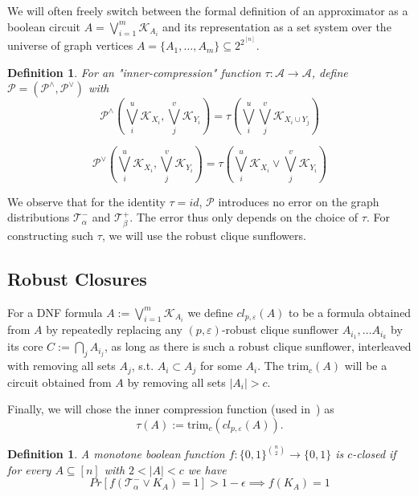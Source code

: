 \documentclass[10pt,a4paper]{article}
\newcommand{\trim}{\mathrm{trim}}
\newcommand{\cl}{cl}
\newtheorem{definition}[theorem]{Definition}
\newcommand{\icomp}{\tau}
\begin{document}
We will often freely switch between the formal definition of an approximator as a boolean circuit $A = \bigvee_{i=1}^{m} \mathcal{K}_{A_i}$ and its representation as a set system over the universe of graph vertices $A = \{A_1, \dots, A_m\} \subseteq 2^{2^{[n]}}$.

\begin{definition}
    \label{def:approximation-gates}
    For an "inner-compression" function $\icomp: \mathcal{A} \to \mathcal{A}$, define $\mathcal{P} = (\mathcal{P}^\wedge, \mathcal{P}^\vee)$ with
    \begin{equation*}
        \mathcal{P}^\wedge(\bigvee_i^u \mathcal{K}_{X_i}, \bigvee_j^v \mathcal{K}_{Y_i}) = \icomp(\bigvee_i^u \bigvee_j^v \mathcal{K}_{X_i \cup Y_j})
    \end{equation*}

    \begin{equation*}
        \mathcal{P}^\vee(\bigvee_i^u \mathcal{K}_{X_i}, \bigvee_j^v \mathcal{K}_{Y_i}) = \icomp(\bigvee_i^u \mathcal{K}_{X_i} \vee \bigvee_j^v \mathcal{K}_{Y_i})
    \end{equation*}
\end{definition}

We observe that for the identity $\icomp = id$, $\mathcal{P}$ introduces no error on the graph distributions $\mathcal{T}^-_\alpha$ and $\mathcal{T}^+_\beta$. The error thus only depends on the choice of $\icomp$. For constructing such $\icomp$, we will use the robust clique sunflowers.

\subsection{Robust Closures}
For a DNF formula $A := \bigvee_{i=1}^m \mathcal{K}_{A_i}$ we define $\cl_{p, \varepsilon}(A)$ to be a formula obtained from $A$ by repeatedly replacing any $(p, \varepsilon)$-robust clique sunflower $A_{i_1}, \ldots A_{i_k}$ by its core $C := \bigcap_{j} A_{i_j}$, as long as there is such a robust clique sunflower, interleaved with removing all sets $A_j$, s.t. $A_i \subset A_j$ for some $A_i$. The $\trim_c(A)$ will be a circuit obtained from $A$ by removing all sets $|A_{i}| > c$.

Finally, we will chose the inner compression function (used in~) as 
\begin{equation*}
    \tau(A) := \trim_c(\cl_{p, \varepsilon}(A)).
\end{equation*}

\iffalse
\begin{definition}
    A monotone boolean function $f: \{0, 1\}^{\binom{n}{2}} \rightarrow \{0, 1\}$ is $c$-closed if for every $A \subseteq [n]$ with $2 < |A| < c$ we have
    $$Pr[f(\mathcal{T}^-_\alpha \vee K_A) = 1] > 1 - \epsilon \implies f(K_A) = 1$$
\end{definition}
\end{document}
